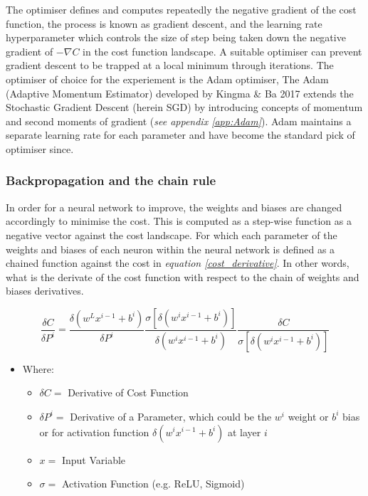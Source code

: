 \documentclass[11pt, a4paper, twoside]{report}
\begin{document}
The optimiser defines and computes repeatedly the negative gradient of the cost function, the process is known as gradient descent, and the learning rate hyperparameter which controls the size of step being taken down the negative gradient of $- \nabla C$ in the cost function landscape. A suitable optimiser can prevent gradient descent to be trapped at a local minimum through iterations. The optimiser of choice for the experiement is the Adam optimiser, The Adam (Adaptive Momentum Estimator) developed by Kingma \& Ba 2017 extends the Stochastic Gradient Descent (herein SGD) by introducing concepts of momentum and second moments of gradient (\textit{see appendix \ref{app:Adam}}). Adam maintains a separate learning rate for each parameter and have become the standard pick of optimiser since.\\\par

\subsubsection{Backpropagation and the chain rule}\label{Backprop&Chain}

In order for a neural network to improve, the weights and biases are changed accordingly to minimise the cost. This is computed as a step-wise function as a negative vector against the cost landscape. For which each parameter of the weights and biases of each neuron within the neural network is defined as a chained function against the cost in \textit{equation \ref{cost_derivative}}. In other words, what is the derivate of the cost function with respect to the chain of weights and biases derivatives.\\\par

\begin{equation}
  \label{cost_derivative}
  \frac{\delta C}{\delta P^{i}} = \frac{\delta(w^{L}x^{i-1} + b^{i})}{\delta P^{i}} \frac{\sigma[\delta(w^{i}x^{i-1} + b^{i})]}{\delta (w^{i}x^{i-1} + b^{i})} \frac{\delta C}{\sigma[\delta(w^{i}x^{i-1} + b^{i})]}
\end{equation}

\begin{itemize}
  \item Where:
    \begin{itemize}
      \item $\delta C =$ Derivative of Cost Function
      \item $\delta P^{i} =$ Derivative of a Parameter, which could be the $w^{i}$ weight or $b^{i}$ bias or for activation function $\delta(w^{i}x^{i-1} + b^{i})$ at layer $i$
      \item $x = $ Input Variable
      \item $\sigma =$ Activation Function (e.g. ReLU, Sigmoid)
   \end{itemize}
\end{itemize}
\end{document}
